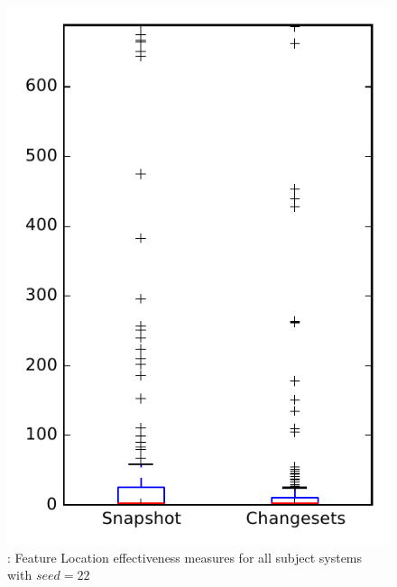 
\begin{figure}
\centering
\includegraphics[height=0.4\textheight]{figures/flt_seed/rq1_overview_22}
\caption{\rone: Feature Location effectiveness measures for all subject systems with $seed=22$}
\label{fig:flt_seed:rq1:overview}
\end{figure}
